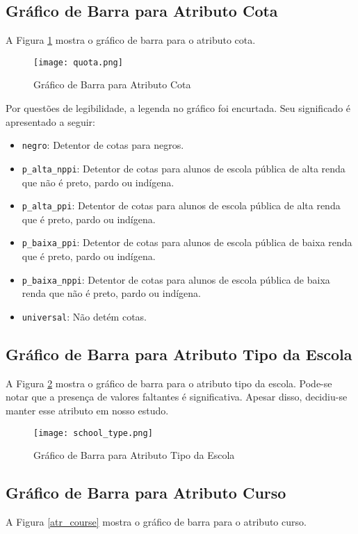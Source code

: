 \subsection{Gráfico de Barra para Atributo Cota}
A Figura \ref{atr_quota} mostra o gráfico de barra para o atributo cota. 
\begin{figure}[!ht]
    \caption{Gráfico de Barra para Atributo Cota}
    \centering
    \texttt{[image: quota.png]}
    \label{atr_quota}
\end{figure}

Por questões de legibilidade, a legenda no gráfico foi encurtada. Seu significado é
apresentado a seguir: 
\begin{itemize}
    \item \texttt{negro}: Detentor de cotas para negros.
    \item \texttt{p\_alta\_nppi}: Detentor de cotas para alunos de escola pública de
        alta renda que não é preto, pardo ou indígena.
    \item \texttt{p\_alta\_ppi}: Detentor de cotas para alunos de escola pública de
        alta renda que é preto, pardo ou indígena.
    \item \texttt{p\_baixa\_ppi}: Detentor de cotas para alunos de escola pública de
        baixa renda que é preto, pardo ou indígena.
    \item \texttt{p\_baixa\_nppi}: Detentor de cotas para alunos de escola pública de
        baixa renda que não é preto, pardo ou indígena.
    \item \texttt{universal}: Não detém cotas.
\end{itemize}

\subsection{Gráfico de Barra para Atributo Tipo da Escola}
A Figura \ref{atr_school} mostra o gráfico de barra para o atributo tipo da escola.
Pode-se notar que a presença de valores faltantes é significativa. Apesar disso,
decidiu-se manter esse atributo em nosso estudo. 
\begin{figure}[!ht]
    \caption{Gráfico de Barra para Atributo Tipo da Escola}
    \centering
    \texttt{[image: school\_type.png]}
    \label{atr_school}
\end{figure}

\subsection{Gráfico de Barra para Atributo Curso}
A Figura \ref{atr_course} mostra o gráfico de barra para o atributo curso. 

